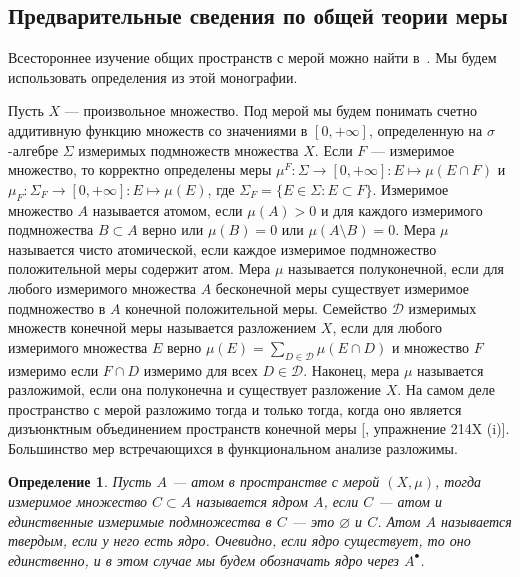 \documentclass[12pt]{article}
\numberwithin{equation}{subsection}
\theoremstyle{plain}
\newtheorem{definition}{Определение}
\begin{document}
\begin{fulltext}
    \section{Предварительные сведения по общей теории
      меры}\label{SectionPreliminariesOnGeneralMeasureTheory}

    Всестороннее изучение общих пространств с мерой можно найти
    в~\cite{FremMeasTh2}. Мы будем использовать определения из этой монографии.

    Пусть $X$ --- произвольное множество. Под мерой мы будем понимать счетно
    аддитивную функцию множеств со значениями в $[0,+\infty]$, определенную на
    $\sigma$-алгебре $\Sigma$ измеримых подмножеств множества $X$. Если $F$ ---
    измеримое множество, то корректно определены меры
    $\mu^F:\Sigma\to[0,+\infty]:E\mapsto \mu(E\cap F)$ и
    $\mu_F:\Sigma_F\to[0,+\infty]: E\mapsto \mu(E)$, где
    $\Sigma_F=\{E\in\Sigma:E\subset F\}$. Измеримое множество $A$ называется
    атомом, если $\mu(A)>0$ и для каждого измеримого подмножества $B\subset A$
    верно или $\mu(B)=0$ или $\mu(A\setminus B)=0$. Мера $\mu$ называется чисто
    атомической, если каждое измеримое подмножество положительной меры содержит
    атом. Мера $\mu$ называется полуконечной, если для любого измеримого
    множества $A$ бесконечной меры существует измеримое подмножество в $A$
    конечной положительной меры. Семейство $\mathcal{D}$ измеримых множеств
    конечной меры называется разложением $X$, если для любого измеримого
    множества $E$ верно $\mu(E)=\sum_{D\in\mathcal{D}}\mu(E\cap D)$ и множество
    $F$ измеримо если $F\cap D$ измеримо для всех $D\in\mathcal{D}$. Наконец,
    мера $\mu$ называется разложимой, если она полуконечна и существует
    разложение $X$. На самом деле пространство с мерой разложимо тогда и только
    тогда, когда оно является дизъюнктным объединением пространств конечной меры
    [\cite{FremMeasTh2}, упражнение 214X (i)]. Большинство мер встречающихся в
    функциональном анализе разложимы.

    \begin{definition}\label{AtomCore} Пусть $A$ --- атом в пространстве с мерой
        $(X,\mu)$, тогда измеримое множество $C\subset A$ называется ядром $A$,
        если $C$ --- атом и единственные измеримые подмножества в $C$ --- это
        $\varnothing$ и $C$. Атом $A$ называется твердым, если у него есть ядро.
        Очевидно, если ядро существует, то оно единственно, и в этом случае мы
        будем обозначать ядро через $A^\bullet$.
    \end{definition}


\end{fulltext}
\end{document}
